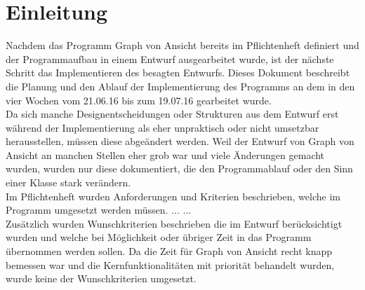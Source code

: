 \chapter{Einleitung}
\label{ch:einleitung}

Nachdem das Programm Graph von Ansicht bereits im Pflichtenheft definiert und der Programmaufbau in einem Entwurf ausgearbeitet wurde, ist der nächste Schritt das Implementieren des besagten Entwurfs.
Dieses Dokument beschreibt die Planung und den Ablauf der Implementierung des Programms an dem in den vier Wochen vom 21.06.16 bis zum 19.07.16 gearbeitet wurde. \\
Da sich manche Designentscheidungen oder Strukturen aus dem Entwurf erst während der Implementierung als eher unpraktisch oder nicht umsetzbar herausstellen, müssen diese abgeändert werden. Weil der Entwurf von Graph von Ansicht an manchen Stellen eher grob war und viele Änderungen gemacht wurden, wurden nur diese dokumentiert, die den Programmablauf oder den Sinn einer Klasse stark verändern. \\
Im Pflichtenheft wurden Anforderungen und Kriterien beschrieben, welche im Programm umgesetzt werden müssen. ... ...\\
Zusätzlich wurden Wunschkriterien beschrieben die im Entwurf berücksichtigt wurden und welche bei Möglichkeit oder übriger Zeit in das Programm übernommen werden sollen. Da die Zeit für Graph von Ansicht recht knapp bemessen war und die Kernfunktionalitäten mit priorität behandelt wurden, wurde keine der Wunschkriterien umgesetzt.